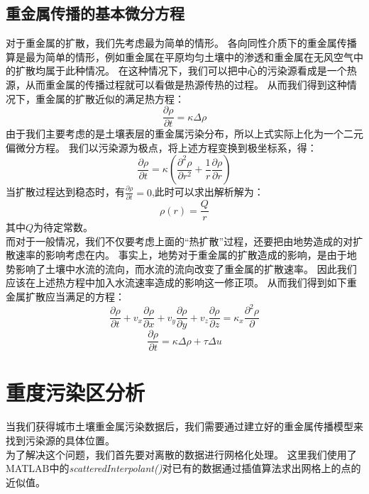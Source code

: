 \documentclass[a4paper]{article}
\begin{document}
\subsection{重金属传播的基本微分方程}
对于重金属的扩散，我们先考虑最为简单的情形。
各向同性介质下的重金属传播算是最为简单的情形，例如重金属在平原均匀土壤中的渗透和重金属在无风空气中的扩散均属于此种情况。
在这种情况下，我们可以把中心的污染源看成是一个热源，从而重金属的传播过程就可以看做是热源传热的过程。
从而我们得到这种情况下，重金属的扩散近似的满足热方程：
\begin{equation}
\frac{\partial \rho}{\partial t} = \kappa \Delta \rho
\end{equation}
由于我们主要考虑的是土壤表层的重金属污染分布，所以上式实际上化为一个二元偏微分方程。
我们以污染源为极点，将上述方程变换到极坐标系，得：
\begin{equation}
\frac{\partial \rho}{\partial t} = \kappa(\frac{\partial^2 \rho}{\partial r^2}+\frac{1}{r}\frac{\partial \rho}{\partial r})
\end{equation}
当扩散过程达到稳态时，有$\frac{\partial \rho}{\partial t} = 0$,此时可以求出解析解为：
\begin{equation}
\rho(r) = \frac{Q}{r}
\end{equation}
其中$Q$为待定常数。\\

\indent 而对于一般情况，我们不仅要考虑上面的“热扩散”过程，还要把由地势造成的对扩散速率的影响考虑在内。
事实上，地势对于重金属的扩散造成的影响，是由于地势影响了土壤中水流的流向，而水流的流向改变了重金属的扩散速率。
因此我们应该在上述热方程中加入水流速率造成的影响这一修正项。
从而我们得到如下重金属扩散应当满足的方程：
\begin{equation}
\frac{\partial \rho}{\partial t} + v_x\frac{\partial \rho}{\partial x} +v_y\frac{\partial \rho}{\partial y} + v_z\frac{\partial \rho}{\partial z}
= \kappa_x\frac{\partial^2 \rho}{\partial }
\end{equation}
\begin{equation}
\frac{\partial \rho}{\partial t} = \kappa \Delta \rho + \tau \Delta u
\end{equation}

\section{重度污染区分析}
当我们获得城市土壤重金属污染数据后，我们需要通过建立好的重金属传播模型来找到污染源的具体位置。\\
\indent 为了解决这个问题，我们首先要对离散的数据进行网格化处理。
这里我们使用了MATLAB中的\emph{scatteredInterpolant()}对已有的数据通过插值算法求出网格上的点的近似值。
\end{document}
